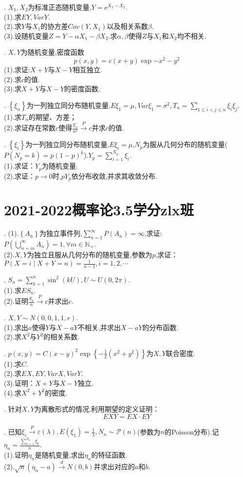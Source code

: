 \documentclass[lang=cn,10pt]{elegantbook}
\begin{document}
. $X_1,X_2$为标准正态随机变量,$Y=\mathrm{e}^{X_1-X_2}$.\\
(1).求$EY,VarY$.\\
(2).求$Y$与$X_1$的协方差$Cov(Y,X_1)$以及相关系数$\beta$.\\
(3).设随机变量$Z=Y-\alpha X_1-\beta X_2$.求$\alpha,\beta$使得$Z$与$X_1$和$X_2$均不相关.

. $X,Y$为随机变量,密度函数
$$p(x,y)=c(x+y)\exp{-x^2-y^2}$$
(1).求证:$X+Y$与$X-Y$相互独立.\\
(2).求$c$的值.\\
(3).求$X+Y$与$X-Y$的密度函数.

. $\left\{\xi_n\right\}$为一列独立同分布随机变量,$E\xi_1=\mu,Var\xi_1=\sigma^2,T_n=\sum_{1\leq i<j\leq n}\xi_i\xi_j$.\\
(1).求$T_n$的期望、方差；\\
(2).求证存在常数$c$使得$\frac{T_n}{n^2}\xrightarrow{P}c$并求$c$的值.

. $\left\{\xi_i\right\}$为一列独立同分布随机变量,$E\xi_i=\mu$,$N_p$为服从几何分布的随机变量($P(N_p=k)=p(1-p)^k$).$Y_p=\sum_{i=1}^{N_p}\xi_i$.\\
(1).求证：$Y_p$为随机变量.\\
(2).求证：$p\to 0$时,$pY_p$依分布收敛,并求其收敛分布.
\newpage
\section{2021-2022概率论3.5学分zlx班}
. (1).$\left\{A_n\right\}$为独立事件列,$\sum_{n=1}^{\infty}P(A_n)=\infty$,求证:$P\left(\bigcup_{n=m}^{\infty}A_n\right)=1,\forall m\in \mathbb{N}_+$.\\
(2).$X,Y$为独立且服从几何分布的随机变量,参数为$p$,求证：$P(X=i\mid X+Y=n)=\frac{1}{n-1},i=1,2,\cdots$

. $S_n=\sum_{k=1}^n\sin^2(kU),U\sim U(0,2\pi)$.\\
(1).求$ES_n$.\\
(2).证明$\frac{S_n}{n}\xrightarrow{P}c$并求出$c$.

. $X,Y\sim N(0,0,1,1,r)$.\\
(1).求出$a$使得$Y$与$X-aY$不相关,并求出$X-aY$的分布函数.\\
(2).求$X^2$与$Y^2$的相关系数.

. $p(x,y)=C(x-y)^2\exp{\left\{-\frac{1}{2}(x^2+y^2)\right\}}$为$X,Y$联合密度.\\
(1).求$C$.\\
(2).求$EX,EY,VarX,VarY$.\\
(3).证明：$X+Y$与$X-Y$独立.\\
(4).求$X^2+Y^2$的密度.

. 针对$X,Y$为离散形式的情况,利用期望的定义证明：$$EXY=EX\cdot EY$$

. 已知$\xi_i\xrightarrow{P}\varepsilon(\lambda),E(\xi_1)=\frac{1}{\lambda},N_n\sim \mathcal{P}(n)$(参数为$n$的Poisson分布).记$\eta_n=\frac{\sum_{k=1}^{N_n}\xi_k}{n}$.\\
(1).证明$\eta_n$是随机变量,求出$\eta_n$的特征函数.\\
(2).$\sqrt{n}(\eta_n-a)\xrightarrow{d}N(0,b)$并求出对应的$a$和$b$.
\newpage
\end{document}
